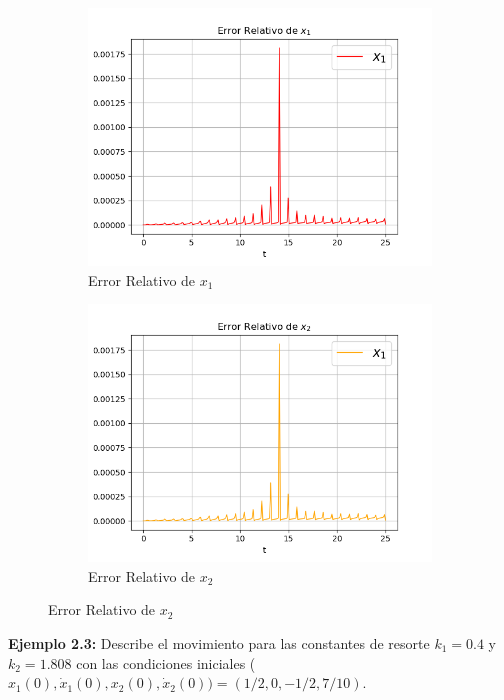 \documentclass[a4paper]{article}
\begin{document}
\begin{figure}[ht!]
\begin{subfigure}{0.6\textwidth}
  \centering
  \includegraphics[width=\linewidth]{error2_2_1.png}
   \caption{Error Relativo de $x_1$}
\end{subfigure}
\begin{subfigure}{0.6\textwidth}
  \centering
  \includegraphics[width=\linewidth]{error2_2_2.png}
  \caption{Error Relativo de $x_2$}
\end{subfigure}
\end{figure}

\textbf{Ejemplo 2.3:} Describe el movimiento para las constantes de resorte $k_1 = 0.4$ y $k_2 = 1.808$ con las condiciones iniciales ($x_1(0), \dot x_1(0), x_2(0), \dot x_2(0)) = (1/2,0,-1/2,7/10)$.
\end{document}
